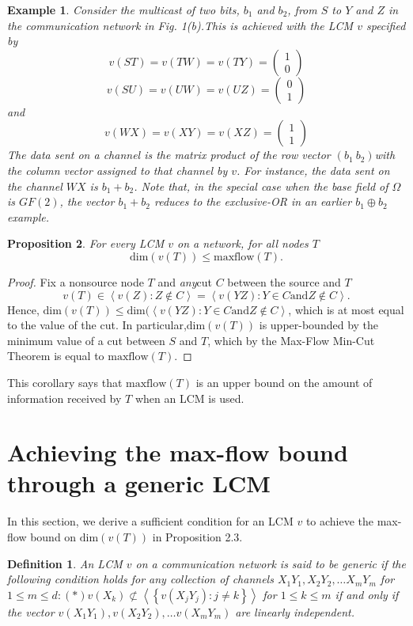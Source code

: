\documentclass[journal]{IEEEtran}
\newcounter{foo}[section]
\newtheorem{prop}{Proposition}[foo]
\newtheorem*{defi}{Definition}
\newtheorem{exam}[prop]{Example}
\newtheorem*{proof}{\hskip 2em Proof}
\begin{document}
\begin{exam}
	Consider the multicast of two bits, $b_1$ and $b_2$, from $S$ to $Y$ and $Z$ in the communication network in Fig. 1(b).This is achieved with the LCM $v$ specified by
	$$ v(ST)=v(TW)=v(TY)=\begin{pmatrix} 1 \\ 0 \end{pmatrix}$$
	$$ v(SU)=v(UW)=v(UZ)=\begin{pmatrix} 0 \\ 1 \end{pmatrix}$$
	and
	$$ v(WX)=v(XY)=v(XZ)=\begin{pmatrix} 1 \\ 1 \end{pmatrix}$$
	The data sent on a channel is the matrix product of the \emph{row} vector $(b_1 \ b_2) $with the \emph{column} vector assigned to that channel by $v$. For instance, the data sent on the channel $WX$ is $b_1+b_2$. Note that, in the special case when the base field of $\Omega$ is $GF(2)$, the vector $b_1+b_2$ reduces to the exclusive-OR in an earlier $b_1\oplus b_2$ example.
\end{exam}


\begin{prop}
	For every LCM $v$ on a network, for all nodes $T$
	$$ \text{dim}(v(T)) \leq \text{maxflow}(T).$$
\end{prop}


\begin{proof}
	Fix a nonsource node $T$ and \emph{any}cut $C$ between the source and $T$
	$$v(T)\in \left \langle v(Z):Z\notin C \right \rangle = \left \langle v(YZ):Y\in C \text{and} Z\notin C \right \rangle.$$
	Hence, $\text{dim}(v(T))\leq \text{dim}(\left \langle v(YZ):Y\in C \text{and} Z\notin C \right \rangle$, which is at most equal to the value of the cut. In particular,$\text{dim}(v(T))$ is upper-bounded by the minimum value of a cut between $S$ and $T$, which by the Max-Flow Min-Cut Theorem is equal to $\text{maxflow}(T)$.
\end{proof}


\par 
This corollary says that $\text{maxflow}(T)$ is an upper bound on the amount of information received by $T$ when an LCM is used.

\section{Achieving the max-flow bound through a generic LCM}\label{sec: achieving}
\par
In this section, we derive a sufficient condition for an LCM $v$ to achieve the max-flow bound on $\text{dim}(v(T))$ in Proposition 2.3.
\begin{defi}
	An LCM $v$ on a communication network is said to be \emph{generic} if the following condition holds for any collection of channels $X_1Y_1, X_2Y_2, \dots X_mY_m$ for $1\leq m \leq d: (*)v(X_k)\nsubset \left \langle \left \{ v(X_jY_j):j \neq k\right \} \right \rangle$ for $1\leq k \leq m$ if and only if the vector $v(X_1Y_1), v(X_2Y_2), \dots v(X_mY_m)$ are linearly independent.
\end{defi}
\end{document}
